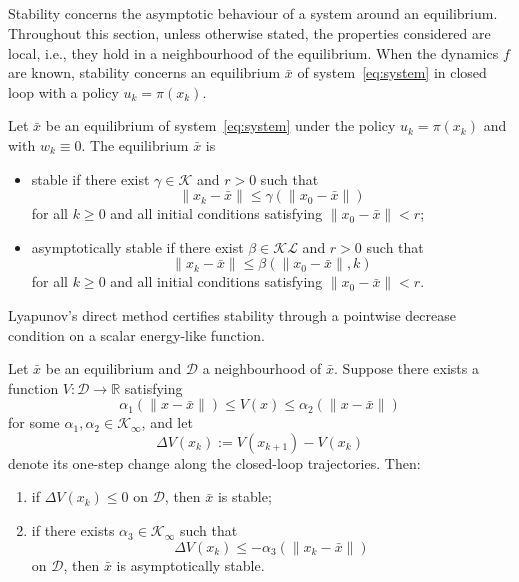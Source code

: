 \subsection{\texorpdfstring{}{Nominal Stability}}
Stability concerns the asymptotic behaviour of a system around an equilibrium. Throughout this section, unless otherwise stated, the properties considered are local, i.e., they hold in a neighbourhood of the equilibrium.
When the dynamics $f$ are known, stability concerns an equilibrium $\bar x$ of system~\eqref{eq:system} in closed loop with a policy $u_k=\pi(x_k)$.

\begin{defn}\label{def:lyapunov}
	Let $\bar x$ be an equilibrium of system~\eqref{eq:system} under the
	policy $u_k=\pi(x_k)$ and with $w_k \equiv 0$. The equilibrium $\bar x$ is
	\begin{itemize}
		\item stable if there exist $\gamma \in \mathcal K$ and $r > 0$ such that
		      \[
			      \|x_k - \bar x\|
			      \le
			      \gamma(\|x_0 - \bar x\|)
		      \]
		      for all $ k \ge 0$ and all initial conditions satisfying $\|x_0 - \bar x\| < r$;
		\item asymptotically stable if there exist $\beta\in\mathcal{KL}$ and $r > 0$ such that
		      \[
			      \|x_k-\bar x\|
			      \le
			      \beta(\|x_0-\bar x\|,k)
		      \]
		      for all $k \ge 0$ and all initial conditions satisfying  $\|x_0 - \bar x\| < r$.
	\end{itemize}
\end{defn}

Lyapunov's direct method certifies stability through a pointwise decrease condition on a scalar energy-like function.

\begin{thm}\label{thm:lyapunov}
	Let $\bar x$ be an equilibrium and $\mathcal{D}$ a neighbourhood of
	$\bar x$. Suppose there exists a function
	$V : \mathcal{D} \to \mathbb{R}$ satisfying
	\[
		\alpha_1(\|x-\bar x\|)
		\le
		V(x)
		\le
		\alpha_2(\|x-\bar x\|)
	\]
	for some $\alpha_1,\alpha_2\in\mathcal K_\infty$, and let
	\[
		\Delta V(x_k)
		:=
		V(x_{k+1})-V(x_k)
	\]
	denote its one-step change along the closed-loop trajectories. Then:
	\begin{enumerate}
		\item if $\Delta V(x_k)\le0$ on $\mathcal D$, then $\bar x$ is stable;
		\item if there exists $\alpha_3\in\mathcal K_\infty$ such that
		      \[
			      \Delta V(x_k)
			      \le
			      -\alpha_3(\|x_k-\bar x\|)
		      \]
		      on $\mathcal D$, then $\bar x$ is asymptotically stable.
	\end{enumerate}
\end{thm}


